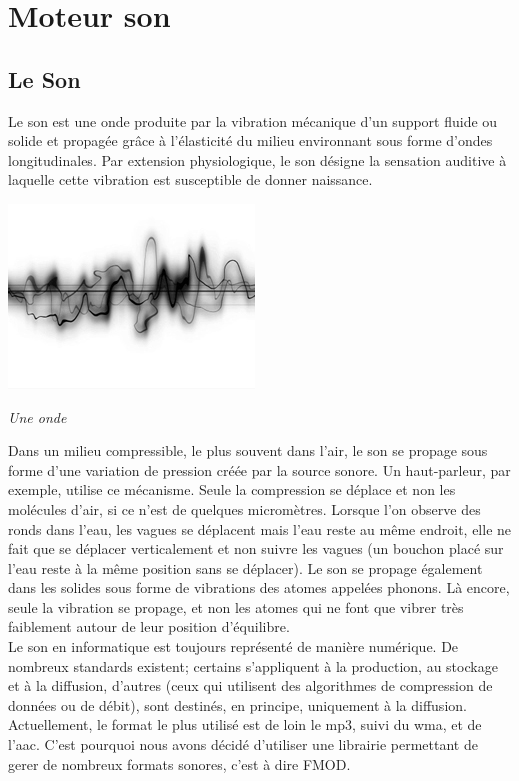 \documentclass[12pt,a4paper]{report}
\begin{document}
\chapter{Moteur son}
\section{Le Son}


Le son est une onde produite par la vibration mécanique d'un support fluide ou solide et propagée grâce à l'élasticité du milieu environnant sous forme d'ondes longitudinales. Par extension physiologique, le son désigne la sensation auditive à laquelle cette vibration est susceptible de donner naissance.\\
\begin{center}

\includegraphics[scale=0.7]{onde.jpg}

\it{Une onde}
\end{center}

Dans un milieu compressible, le plus souvent dans l'air, le son se propage sous forme d'une variation de pression créée par la source sonore. Un haut-parleur, par exemple, utilise ce mécanisme. Seule la compression se déplace et non les molécules d'air, si ce n'est de quelques micromètres. Lorsque l'on observe des ronds dans l'eau, les vagues se déplacent mais l'eau reste au même endroit, elle ne fait que se déplacer verticalement et non suivre les vagues (un bouchon placé sur l'eau reste à la même position sans se déplacer). Le son se propage également dans les solides sous forme de vibrations des atomes appelées phonons. Là encore, seule la vibration se propage, et non les atomes qui ne font que vibrer très faiblement autour de leur position d'équilibre.\\

Le son en informatique est toujours représenté de manière numérique. De nombreux standards existent; certains s'appliquent à la production, au stockage et à la diffusion, d'autres (ceux qui utilisent des algorithmes de compression de données ou de débit), sont destinés, en principe, uniquement à la diffusion. Actuellement, le format le plus utilisé est de loin le mp3, suivi du wma, et de l'aac. C'est pourquoi nous avons décidé d'utiliser une librairie permettant de gerer de nombreux formats sonores, c'est à dire FMOD.\\
\end{document}
